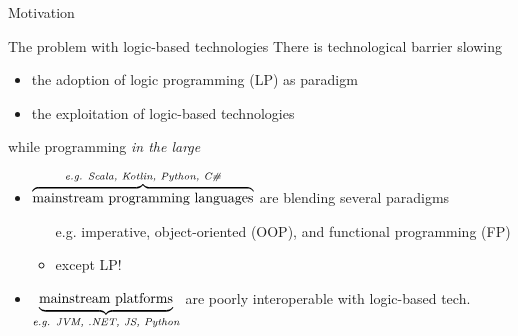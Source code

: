 \documentclass[presentation]{beamer}
\begin{document}
\begin{frame}[c]{Motivation}

    \begin{alertblock}{The problem with logic-based technologies}
        There is technological barrier slowing
        \begin{itemize}
            \item the adoption of logic programming (LP) as paradigm
            \item the exploitation of logic-based technologies
        \end{itemize}
        while programming \emph{in the large}
    \end{alertblock}

    \vfill

    \begin{itemize}
        \item $\overbrace{\text{mainstream programming languages}}^\text{\itshape e.g. Scala, Kotlin, Python, C\#}$ are blending several paradigms
        \begin{itemize}
            \item[e.g.] imperative, object-oriented (OOP), and functional programming (FP)
            \item except LP!
        \end{itemize}

        \vfill

        \item $\underbrace{\text{mainstream platforms}}_\text{\itshape e.g. JVM, .NET, JS, Python}$ are poorly interoperable with logic-based tech.
    \end{itemize}

\end{frame}
\end{document}

